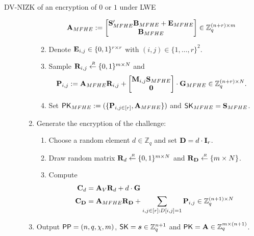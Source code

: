 \begin{subsection}{DV-NIZK of an encryption of $0$ or $1$ under LWE}
\begin{description}
\begin{enumerate}
\begin{enumerate}
\begin{align*}
            \mathbf{A}_{MFHE} &:= \begin{bmatrix}\mathbf{S}_{MFHE}'\mathbf{B}_{MFHE} + \mathbf{E}_{MFHE} \\ \mathbf{B}_{MFHE}\end{bmatrix} \in \mathbb{Z}_q^{(n+r) \times m}
          \end{align*}
        \item Denote $\mathbf{E}_{i,j} \in \{0, 1\}^{r\times r}$ with $(i,j) \in \{1, \dots ,r\}^2$.
        \item Sample $\mathbf{R}_{i,j} \stackrel{{\scriptscriptstyle \mkern4mu R}}{\gets} \{0,1\}^{m \times N}$ and
          \begin{align*}
            \mathbf{P}_{i,j} &:= \mathbf{A}_{MFHE} \mathbf{R}_{i,j} + \begin{bmatrix}\mathbf{M}_{i,j}\mathbf{S}_{MFHE}\\ \mathbf{0}\end{bmatrix}\cdot  \mathbf{G}_{MFHE} \in \mathbb{Z}_q^{(n+r) \times N}.
          \end{align*}
        \item Set $\mathsf{PK}_{MFHE} := (\{\mathbf{P}_{i,j \in [r]}, \mathbf{A}_{MFHE}\})$ and $\mathsf{SK}_{MFHE} = \mathbf{S}_{MFHE}$.
        \end{enumerate}
      \item Generate the encryption of the challenge:
        \begin{enumerate}
        \item Choose a random element $d \in \mathbb{Z}_{q}$ and set $\mathbf{D} = d \cdot \mathbf{I}_r$.
        \item Draw random matrix $\mathbf{R}_d \stackrel{{\scriptscriptstyle \mkern4mu R}}{\gets} \{0,1\}^{m \times N}$ and $\mathbf{R}_{\mathbf{D}} \stackrel{{\scriptscriptstyle \mkern4mu R}}{\gets} \{m \times N\}$.
        \item Compute
          \begin{align*}
            \mathbf{C}_d &= \mathbf{A}_V \mathbf{R}_d + d \cdot \mathbf{G}\\
            \mathbf{C}_{\mathbf{D}} &= \mathbf{A}_{MFHE} \mathbf{R}_{\mathbf{D}} + \sum_{i,j \in [r]: D[i,j] = 1} \mathbf{P}_{i,j} \in \mathbb{Z}_q^{(n+1) \times N}
          \end{align*}
        \end{enumerate}
      \item Output ${\mathsf{PP}} = (n, q, \chi, m)$, $\SK = \vec{s} \in \mathbb{Z}_q^{n+1}$ and $\mathsf{PK} = \mathbf{A} \in \mathbb{Z}_q^{m \times (n+1)}$.
      \end{enumerate}
 
 
 

\end{description}
\end{subsection}
